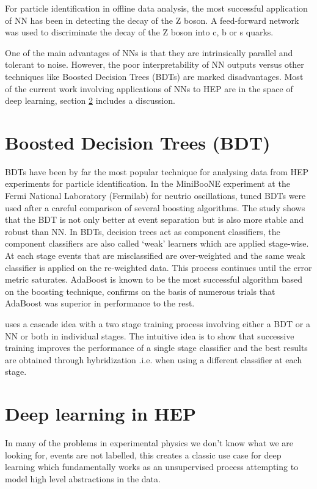 For particle identification in offline data analysis, the most successful application of NN has been in detecting the decay of the Z boson. A feed-forward network was used to discriminate the decay of the Z boson into c, b or s quarks. 

One of the main advantages of NNs is that they are intrinsically parallel and tolerant to noise. However, the poor interpretability of NN outputs versus other techniques like Boosted Decision Trees (BDTs) are marked disadvantages. Most of the current work involving applications of NNs to HEP are in the space of deep learning, section \ref{deep} includes a discussion.  
 
\section{Boosted Decision Trees (BDT)}

BDTs have been by far the most popular technique for analysing data from HEP experiments for particle identification. In the MiniBooNE experiment \cite{yang} at the Fermi National Laboratory (Fermilab) for neutrio oscillations, tuned BDTs were used after a careful comparison of several boosting algorithms. The study shows that the BDT is not only better at event separation but is also more stable and robust than NN. In BDTs, decision trees act as component classifiers, the component classifiers are also called `weak' learners which are applied stage-wise. At each stage events that are misclassified are over-weighted and the same weak classifier is applied on the re-weighted data. This process continues until the error metric saturates. AdaBoost is known to be the most successful algorithm based on the boosting technique, \cite{yang} confirms on the basis of numerous trials that AdaBoost was superior in performance to the rest. 

\cite{cascade} uses a cascade idea with a two stage training process involving either a BDT or a NN or both in individual stages. The intuitive idea is to show that successive training improves the performance of a single stage classifier and the best results are obtained through hybridization .i.e. when using a different classifier at each stage.   

\section{Deep learning in HEP}

\label{deep}

In many of the problems in experimental physics we don't know what we are looking for, events are not labelled, this creates a classic use case for deep learning which fundamentally works as an unsupervised process attempting to model high level abstractions in the data. 

